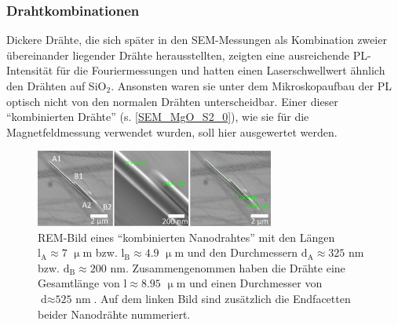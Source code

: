 \subsubsection{Drahtkombinationen}
Dickere Drähte, die sich später in den SEM-Messungen als Kombination zweier übereinander liegender Drähte herausstellten, zeigten eine ausreichende PL-Intensität für die Fouriermessungen und hatten einen Laserschwellwert ähnlich den Drähten auf SiO$_\text{2}$. Ansonsten waren sie unter dem Mikroskopaufbau der PL optisch nicht von den normalen Drähten unterscheidbar. Einer dieser ``kombinierten Drähte'' (s. \autoref{SEM_MgO_S2_0}), wie sie für die Magnetfeldmessung verwendet wurden, soll hier ausgewertet werden.\begin{figure}[b]
\centering
\includegraphics[width=0.7\textwidth]{Bilder/MgO/SEM_MgO_S2_0}
\caption{REM-Bild eines ``kombinierten Nanodrahtes'' mit den Längen \mbox{$\text{l}_\text{A} \approx \text{7 }\upmu\text{m}$} bzw. \mbox{$\text{l}_\text{B} \approx \text{4.9 } \upmu\text{m}$} und den Durchmessern \mbox{$\text{d}_\text{A} \approx \text{325 nm}$} bzw. \mbox{$\text{d}_\text{B} \approx \text{200 nm}$}. Zusammengenommen haben die Drähte eine Gesamtlänge von \mbox{$\text{l} \approx \text{8.95 } \upmu\text{m}$} und einen Durchmesser von \mbox{$\text{d} \approx \text{525 nm}$}. Auf dem linken Bild sind zusätzlich die Endfacetten beider Nanodrähte nummeriert.}
\label{SEM_MgO_S2_0}
\end{figure}
